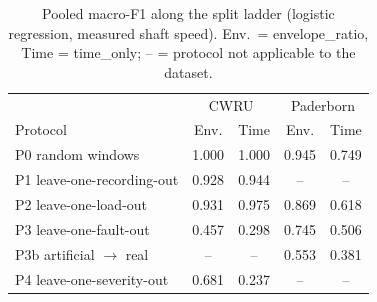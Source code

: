 \begin{table}[t]
\caption{Pooled macro-F1 along the split ladder (logistic regression, measured shaft speed). Env.\ = envelope\_ratio, Time = time\_only; -- = protocol not applicable to the dataset.}
\label{tab:ladder}
\centering
\setlength{\tabcolsep}{4pt}
\begin{tabular}{lcccc}
\hline
 & \multicolumn{2}{c}{CWRU} & \multicolumn{2}{c}{Paderborn} \\
Protocol & Env. & Time & Env. & Time \\
\hline
P0 random windows & 1.000 & 1.000 & 0.945 & 0.749 \\
P1 leave-one-recording-out & 0.928 & 0.944 & -- & -- \\
P2 leave-one-load-out & 0.931 & 0.975 & 0.869 & 0.618 \\
P3 leave-one-fault-out & 0.457 & 0.298 & 0.745 & 0.506 \\
P3b artificial $\rightarrow$ real & -- & -- & 0.553 & 0.381 \\
P4 leave-one-severity-out & 0.681 & 0.237 & -- & -- \\
\hline
\end{tabular}
\end{table}
